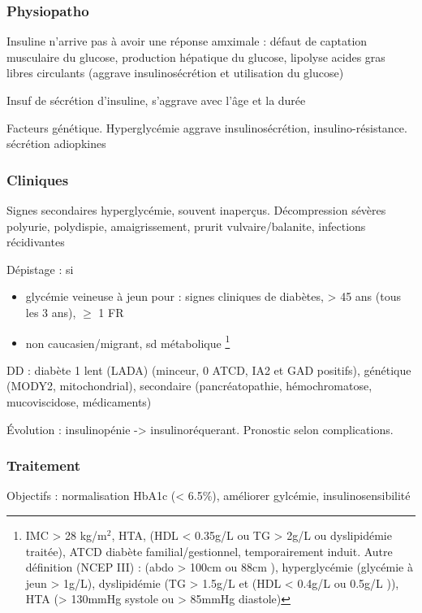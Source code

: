 \documentclass[11pt]{article}
\begin{document}
\subsubsection{Physiopatho}
\label{sec:org18a815a}
Insuline n'arrive pas à avoir une réponse amximale : défaut de captation
musculaire du glucose, \inc production hépatique du glucose, lipolyse \inc acides gras
libres circulants \thus (aggrave \dec insulinosécrétion et utilisation du glucose)

Insuf de sécrétion d'insuline, s'aggrave avec l'âge et la durée

Facteurs génétique. Hyperglycémie aggrave insulinosécrétion,
insulino-résistance. \dec sécrétion adiopkines

\subsubsection{Cliniques}
\label{sec:org4aa45c4}
Signes secondaires hyperglycémie, souvent inaperçus. Décompression sévères \thus
polyurie, polydispie, amaigrissement, prurit vulvaire/balanite, infections
récidivantes

Dépistage : si
\begin{itemize}
\item glycémie veineuse à jeun pour : signes cliniques de diabètes, > 45 ans (tous les 3 ans), \(\ge\) 1 FR
\item non caucasien/migrant, sd métabolique \footnote{IMC > 28 kg/m\(^{\text{2}}\), HTA, (HDL < 0.35g/L ou
  TG > 2g/L ou dyslipidémie traitée), ATCD diabète familial/gestionnel,
  temporairement induit.
Autre définition (NCEP III) : (\diameter abdo > 100cm \male ou 88cm \female), hyperglycémie
  (glycémie à jeun > 1g/L), dyslipidémie (TG > 1.5g/L et (HDL < 0.4g/L \male ou
  0.5g/L \female)), HTA (> 130mmHg systole ou > 85mmHg diastole)}
\end{itemize}

DD : diabète 1 lent (LADA) (minceur, 0 ATCD, IA2 et GAD positifs), génétique
(MODY2, mitochondrial), secondaire (pancréatopathie, hémochromatose,
mucoviscidose, médicaments)

Évolution : insulinopénie -> insulinoréquerant. Pronostic selon complications.

\subsubsection{Traitement}
\label{sec:orgf7c6316}
Objectifs : normalisation HbA1c (< 6.5\%), améliorer gylcémie, insulinosensibilité
\end{document}
